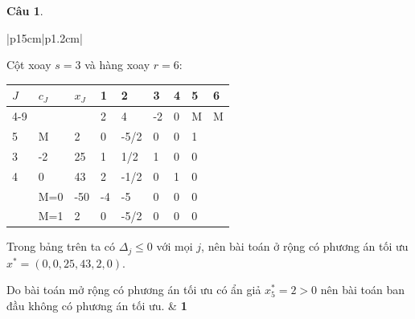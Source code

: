 \documentclass[12pt,a4letter]{article}
\theoremstyle{definition}
\newtheorem{cauhoi}{Câu}
\newenvironment{phandiem}{%
\par\noindent
\begin{longtable}[t]{|p{15cm}|p{1.2cm}|}
\hline
}{%
\end{longtable}
}
\newcommand\diem[1]{ & \hfil \textbf{#1} \\ \hline}
\begin{document}
\begin{cauhoi}
\begin{traloi}
\begin{phandiem}
Cột xoay $s=3$ và hàng xoay $r=6$:
\begin{center}
\renewcommand{\arraystretch}{1.25}
\begin{tabular}{| l | l | l | l  l  l  l  l  l   |}
\hline
$J$&$c_J$&$x_J$&1&2&3&4&5&6\\ 
\cline{4-9}
   &     &   &2&4 &-2&0&M&M\\ 
\hline
5&M     & 2     & 0 &-5/2      & 0      & 0& 1&\\
3&-2     & 25     &1 &1/2      & 1      & 0& 0&\\
4&0     &  43    & 2 &-1/2      & 0      & 1& 0&\\
\hline
&M=0&-50 &-4 &-5 &0  &0& 0&\\
&M=1& 2   & 0  &-5/2&0&0&0& \\
\hline
\end{tabular}
\end{center}

Trong bảng trên ta có $\Delta_j\le 0$ với mọi $j$, nên bài toán ở rộng có phương án tối ưu
$x^*=(0,0,25,43,2,0)$.

Do bài toán mở rộng có phương án tối ưu có ẩn giả $x^*_5=2>0$ nên bài toán ban đầu không có phương án tối ưu.
\diem{1}
\end{phandiem}
 \end{traloi}
\end{cauhoi}
\end{document}
